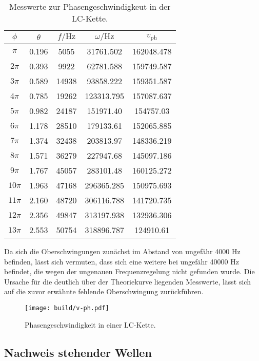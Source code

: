   \begin{table}
    \centering
    \caption{Messwerte zur Phasengeschwindigkeut in der LC-Kette.}
    \label{tab:dispersion1}
    \begin{tabular}{c c c c c}
      \toprule
      $\phi$ & $\theta$ & $f / \si{\hertz}$ & $\omega / \si{\hertz}$ & $v_\mathrm{ph}$ \\
      \midrule
$\pi$ & 0.196 & 5055 & 31761.502 & 162048.478 \\
$2\pi$ & 0.393 &  9922 &  62781.588 & 159749.587 \\
$3\pi$ & 0.589 & 14938 & 93858.222 & 159351.587 \\
$4\pi$ & 0.785 & 19262 & 123313.795 & 157087.637 \\
$5\pi$ & 0.982 & 24187 & 151971.40 & 154757.03 \\
$6\pi$ & 1.178 & 28510 & 179133.61 & 152065.885 \\
$7\pi$ & 1.374 & 32438 & 203813.97 & 148336.219 \\
$8\pi$ &  1.571 & 36279 & 227947.68 & 145097.186 \\
$9\pi$ & 1.767 & 45057 & 283101.48 & 160125.272 \\
$10\pi$ &  1.963 & 47168 & 296365.285 & 150975.693 \\
$11\pi$ & 2.160 & 48720 & 306116.788 & 141720.735 \\
$12\pi$ & 2.356 & 49847 & 313197.938 & 132936.306 \\
$13\pi$ & 2.553 & 50754 & 318896.787 & 124910.61 \\
\bottomrule
\end{tabular}
\end{table}

Da sich die Oberschwingungen zunächst im Abstand von ungefähr 4000 \si{\Hz} befinden, lässt sich vermuten, dass sich eine weitere bei ungefähr 40000 \si{\Hz} befindet, die wegen der ungenauen Frequenzregelung nicht gefunden wurde.
Die Ursache für die deutlich über der Theoriekurve liegenden Messwerte, lässt sich auf die zuvor erwähnte fehlende Oberschwingung zurückführen.

\begin{figure}
  \centering
  \texttt{[image: build/v-ph.pdf]}
\caption{Phasengeschwindigkeit in einer LC-Kette.}
  \label{fig:v-ph}
\end{figure}

\subsection{Nachweis stehender Wellen}

